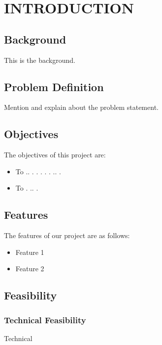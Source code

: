 \chapter{INTRODUCTION}
    \section{Background}
    This is the background.


    
    \section{Problem Definition}
    Mention and explain about the problem statement.
    
    \section{Objectives}
    The objectives of this project are:
        \begin{itemize}
        \setlength\itemsep{1.5pt}
        \item To .. . . . . . .. . 
        \item To . .. . 
        

        \end{itemize}
        
        \section{Features}
        The features of our project are as follows:
         \begin{itemize}
        \setlength\itemsep{1.5pt}
          \item Feature 1
          \item Feature 2
        \end{itemize}
    
        \section{Feasibility}
    
            \subsection{Technical Feasibility}
            Technical
            
